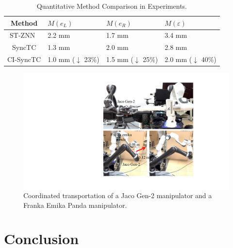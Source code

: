 \documentclass[journal,twoside,web]{ieeecolor}
\begin{document}
\begin{table}[!tbp]
\centering
\caption{Quantitative Method Comparison in Experiments.}
\begin{tabular}{clll}
\toprule
Method                                       & $M(e_L)$ & $M(e_R)$ & $M(\varepsilon)$ \\ \midrule
ST-ZNN~\cite{Chen2020}                                       & 2.2 mm   & 1.7 mm   & 3.4 mm   \\
SyncTC                                       & 1.3 mm   & 2.0 mm   & 2.8 mm   \\
CI-SyncTC                                    & 1.0 mm ($\downarrow$ 23\%)   & 1.5 mm ($\downarrow$ 25\%)  & 2.0 mm ($\downarrow$ 40\%)  \\ \bottomrule
\end{tabular}
\label{table:exp:method comparison}

\end{table}
\begin{figure}[!t]
    \centering
    \includegraphics[width=0.9\linewidth]{figures/experiment/FIG11_TII-24-5492.pdf}
    \caption{Coordinated transportation of a Jaco Gen-2 manipulator and a Franka Emika Panda manipulator.
    }
    \label{Fig:experiment:franka}
\end{figure}

\section{Conclusion} \label{section:conclustion}
\end{document}
